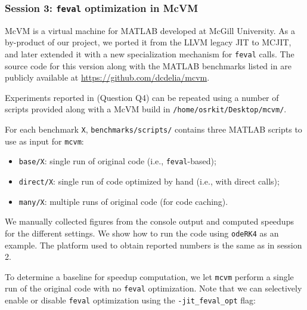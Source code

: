 
\subsubsection{Session 3: {\tt feval} optimization in McVM}

McVM is a virtual machine for MATLAB developed at McGill University. As a by-product of our project, we ported it from the LLVM legacy JIT to MCJIT, and later extended it with a new specialization mechanism for {\tt feval} calls. The source code for this version along with the MATLAB benchmarks listed in  are publicly available at \url{https://github.com/dcdelia/mcvm}.

Experiments reported in  (Question Q4) can be repeated using a number of scripts provided along with a McVM build in {\small\tt /home/osrkit/Desktop/mcvm/}. %

\ifseparateAEdoc{}{\noindent}For each benchmark {\tt X}, {\small\tt benchmarks/scripts/} contains three MATLAB scripts to use as input for {\tt mcvm}:

\begin{itemize}[parsep=0pt]
\item {\tt base/X}: single run of original code (i.e., {\tt feval}-based);
\item {\tt direct/X}: single run of code optimized by hand (i.e., with direct calls);
\item {\tt many/X}: multiple runs of original code (for code caching).
\end{itemize}

\noindent We manually collected figures from the console output and computed speedups for the different settings. We show how to run the code using {\tt odeRK4} as an example. The platform used to obtain reported numbers is the same as in session 2.

To determine a baseline for speedup computation, we let {\tt mcvm} perform a single run of the original code with no {\tt feval} optimization. Note that we can selectively enable or disable {\tt feval} optimization using the {\tt -jit\_feval\_opt} flag:

